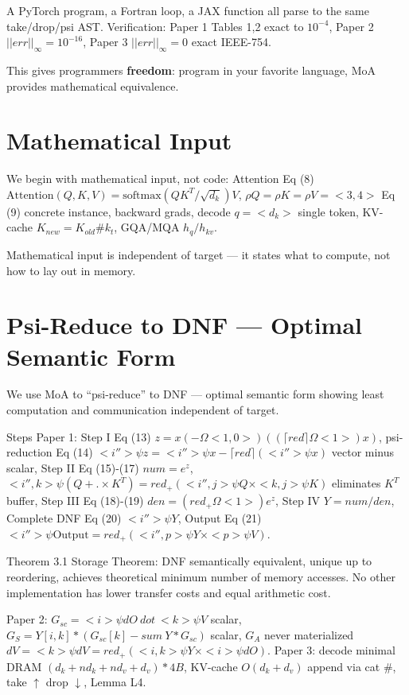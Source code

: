 \documentclass[11pt,a4paper]{article}
\begin{document}
A PyTorch program, a Fortran loop, a JAX function all parse to the same take/drop/psi AST. Verification: Paper 1 Tables 1,2 exact to $10^{-4}$, Paper 2 $||err||_{\infty}=10^{-16}$, Paper 3 $||err||_{\infty}=0$ exact IEEE-754.

This gives programmers \textbf{freedom}: program in your favorite language, MoA provides mathematical equivalence.

\section{Mathematical Input}

We begin with mathematical input, not code: Attention Eq (8) $\text{Attention}(Q,K,V)=\text{softmax}(QK^T/\sqrt{d_k})V$, $\rho Q=\rho K=\rho V=<3,4>$ Eq (9) concrete instance, backward grads, decode $q=<d_k>$ single token, KV-cache $K_{new}=K_{old}\# k_t$, GQA/MQA $h_q/h_{kv}$.

Mathematical input is independent of target — it states what to compute, not how to lay out in memory.

\section{Psi-Reduce to DNF — Optimal Semantic Form}

We use MoA to ``psi-reduce'' to DNF — optimal semantic form showing least computation and communication independent of target.

Steps Paper 1: Step I Eq (13) $z=x(-\Omega<1,0>)((\lceil red\rceil\Omega<1>)x)$, psi-reduction Eq (14) $<i''>\psi z=<i''>\psi x-\lceil red\rceil(<i''>\psi x)$ vector minus scalar, Step II Eq (15)-(17) $num=e^z$, $<i'',k>\psi(Q+.\times K^T)=red_+(<i'',j>\psi Q\times<k,j>\psi K)$ eliminates $K^T$ buffer, Step III Eq (18)-(19) $den=(red_+\Omega<1>)e^z$, Step IV $Y=num/den$, Complete DNF Eq (20) $<i''>\psi Y$, Output Eq (21) $<i''>\psi\text{Output}=red_+(<i'',p>\psi Y\times<p>\psi V)$.

Theorem 3.1 Storage Theorem: DNF semantically equivalent, unique up to reordering, achieves theoretical minimum number of memory accesses. No other implementation has lower transfer costs and equal arithmetic cost.

Paper 2: $G_{sc}=<i>\psi dO\ dot\ <k>\psi V$ scalar, $G_S=Y[i,k]*(G_{sc}[k]-sum\ Y*G_{sc})$ scalar, $G_A$ never materialized $dV=<k>\psi dV=red_+(<i,k>\psi Y\times<i>\psi dO)$. Paper 3: decode minimal DRAM $(d_k+n d_k+n d_v+d_v)*4B$, KV-cache $O(d_k+d_v)$ append via cat $\#$, take $\uparrow$ drop $\downarrow$, Lemma L4.
\end{document}
